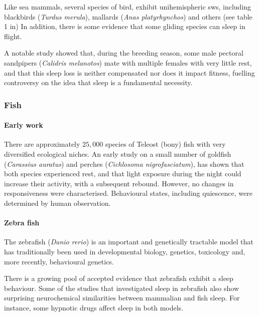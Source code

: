 Like sea mammals, several species of bird, exhibit unihemispheric \gls{sws}, including blackbirds (\emph{Turdus merula})\cite{szymczak_study_1996}, mallards (\emph{Anas platyrhynchos})\cite{rattenborg_half-awake_1999} and others (see table 1 in\cite{rattenborg_avian_2009})
In addition, there is some evidence that some gliding species can sleep in flight\cite{rattenborg_evidence_2016}.

A notable study showed that, during the breeding season, some male pectoral sandpipers (\emph{Calidris melanotos}) mate
with multiple females with very little rest, and that this sleep loss is neither compensated nor  does it impact fitness\cite{lesku_adaptive_2012}, fuelling controversy on the idea that sleep is a fundamental necessity.

\subsubsection{Fish}

\paragraph*{Early work}

There are approximately $25,000$ species of Teleost (bony) fish with very diversified ecological niches\cite{hoegg_phylogenetic_2004}.
An early study on a small number of goldfish (\emph{Carassius auratus}) and perches (\emph{Cichlosoma nigrofasciatum}), 
has shown that both species experienced rest, and that light exposure during the night could increase their activity,
with a subsequent rebound\cite{tobler_effect_1985}.
However, no changes in responsiveness were characterised.
Behavioural states, including quiescence, were determined by human observation.

\paragraph*{Zebra fish}

The zebrafish (\emph{Danio rerio}) is an important and genetically tractable model that has traditionally been used in developmental biology,
genetics, toxicology\cite{hill_zebrafish_2005, lieschke_animal_2007} and, more recently, behavioural genetics\cite{norton_adult_2010}.

There is a growing pool of accepted evidence that zebrafish exhibit a sleep behaviour\cite{zhdanova_melatonin_2001, zhdanova_sleep_2006, yokogawa_characterization_2007, zhdanova_sleep_2011}.
Some of the studies that investigated sleep in zebrafish also show surprising neurochemical similarities between mammalian and fish sleep. 
For instance, some hypnotic drugs affect sleep in both models\cite{zhdanova_melatonin_2001,zhdanova_sleep_2011}.


